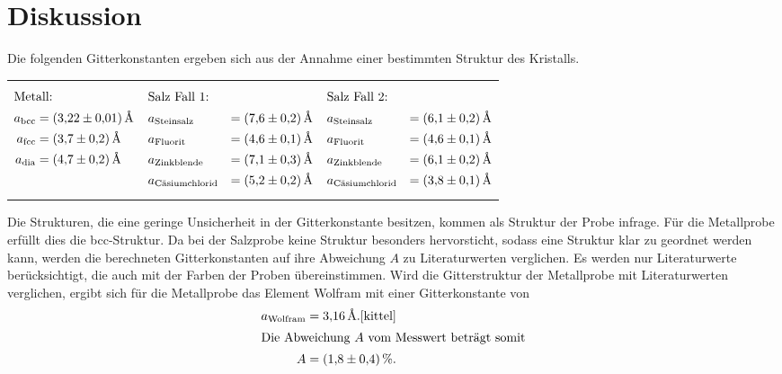 \section{Diskussion}
\label{sec:Diskussion}
Die folgenden Gitterkonstanten ergeben sich aus der Annahme einer
bestimmten Struktur des Kristalls.
\begin{table}
  \centering
\begin{tabular}{p{} p{} p{} }
{\begin{align*}
\intertext{Metall:}
a_{\mathrm{bcc}}&=\SI{3.22(1)}{\angstrom}\\
a_{\mathrm{fcc}}&=\SI{3.7(2)}{\angstrom}\\
a_{\mathrm{dia}}&=\SI{4.7(2)}{\angstrom}
\end{align*}}
&
{\begin{align*}
\intertext{Salz Fall 1:}
&a_{\text{Steinsalz}}&=\SI{7.6(2)}{\angstrom}\\
&a_{\text{Fluorit}}&=\SI{4.6(1)}{\angstrom}\\
&a_{\text{Zinkblende}}&=\SI{7.1(3)}{\angstrom}\\
&a_{\text{Cäsiumchlorid}} &=\SI{5.2(2)}{\angstrom}
\end{align*}}
&
{\begin{align*}
\intertext{Salz Fall 2:}
&a_{\text{Steinsalz}}&=\SI{6.1(2)}{\angstrom}\\
&a_{\text{Fluorit}}&=\SI{4.6(1)}{\angstrom}\\
&a_{\text{Zinkblende}}&=\SI{6.1(2)}{\angstrom}\\
&a_{\text{Cäsiumchlorid}} &=\SI{3.8(1)}{\angstrom}
\end{align*}}
\end{tabular}
\end{table}
Die Strukturen, die eine geringe Unsicherheit in der Gitterkonstante besitzen,
kommen als Struktur der Probe infrage.
Für die Metallprobe erfüllt dies die bcc-Struktur.
Da bei der Salzprobe keine Struktur besonders hervorsticht, sodass
eine Struktur klar zu geordnet werden kann, werden die berechneten
Gitterkonstanten auf ihre Abweichung $A$ zu Literaturwerten verglichen.
Es werden nur Literaturwerte berücksichtigt, die auch mit der Farben der Proben übereinstimmen.
Wird die Gitterstruktur der Metallprobe mit Literaturwerten
verglichen, ergibt sich für die Metallprobe das Element
Wolfram mit einer Gitterkonstante von
\begin{align*}
a_{\text{Wolfram}}=\SI{3.16}{\angstrom}.\text{\cite{kittel}} \\
\intertext{Die Abweichung $A$ vom Messwert beträgt somit}
A=\SI{1.8(4)}{\percent}.
\end{align*}


